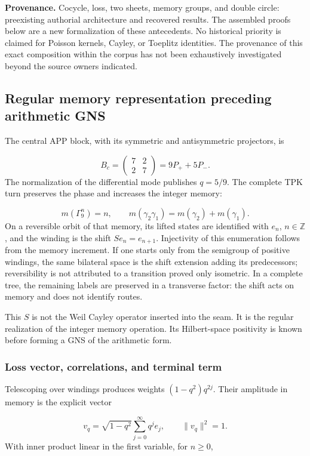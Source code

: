 \textbf{Provenance.} Cocycle, loss, two sheets, memory groups, and double circle: preexisting authorial architecture and recovered results. The assembled proofs below are a new formalization of these antecedents. No historical priority is claimed for Poisson kernels, Cayley, or Toeplitz identities. The provenance of this exact composition within the corpus has not been exhaustively investigated beyond the source owners indicated.


\subsection{Regular memory representation preceding arithmetic GNS}
\label{viii:tm-add-m2}
The central APP block, with its symmetric and antisymmetric projectors, is

\[
B_c=\begin{pmatrix}7&2\\2&7\end{pmatrix}
=9P_++5P_-.
\]
The normalization of the differential mode publishes \(q=5/9\). The complete TPK turn preserves the phase and increases the integer memory:

\[
m(\Gamma_9^n)=n,\qquad
m(\gamma_2\gamma_1)=m(\gamma_2)+m(\gamma_1).
\]
On a reversible orbit of that memory, its lifted states are identified with \(e_n\), \(n\in\mathbb Z\), and the winding is the shift \(Se_n=e_{n+1}\). Injectivity of this enumeration follows from the memory increment. If one starts only from the semigroup of positive windings, the same bilateral space is the shift extension adding its predecessors; reversibility is not attributed to a transition proved only isometric. In a complete tree, the remaining labels are preserved in a transverse factor: the shift acts on memory and does not identify routes.

This \(S\) is not the Weil Cayley operator inserted into the seam. It is the regular realization of the integer memory operation. Its Hilbert-space positivity is known before forming a GNS of the arithmetic form.


\subsubsection{Loss vector, correlations, and terminal term}
\label{viii:tm-add-m2-1}
Telescoping over windings produces weights \((1-q^2)q^{2j}\). Their amplitude in memory is the explicit vector

\[
v_q=\sqrt{1-q^2}\sum_{j=0}^{\infty}q^j e_j,
\qquad \|v_q\|^2=1.
\]
With inner product linear in the first variable, for \(n\ge0\),

